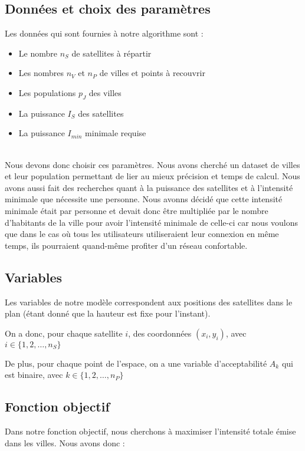 \documentclass[a4paper]{article}
\begin{document}
\subsection{Données et choix des paramètres}
Les données qui sont fournies à notre algorithme sont :
\begin{itemize}
    \item Le nombre $n_S$ de satellites à répartir
    \item Les nombres $n_V$ et $n_P$ de villes et points à recouvrir
    \item Les populations $p_J$ des villes 
    \item La puissance $I_S$ des satellites
    \item La puissance $I_{min}$ minimale requise
\end{itemize}
\\
Nous devons donc choisir ces paramètres. Nous avons cherché un dataset de villes et leur population permettant de lier au mieux précision et temps de calcul. Nous avons aussi fait des recherches quant à la puissance des satellites et à l'intensité minimale que nécessite une personne. Nous avonns décidé que cette intensité minimale était par personne et devait donc être multipliée par le nombre d'habitants de la ville pour avoir l'intensité minimale de celle-ci car nous voulons que dans le cas où tous les utilisateurs utiliseraient leur connexion en même temps, ils pourraient quand-même profiter d'un réseau confortable.


\subsection{Variables}
Les variables de notre modèle correspondent aux positions des satellites dans le plan (étant donné que la hauteur est fixe pour l'instant).

On a donc, pour chaque satellite $i$, des coordonnées $(x_{i},y_{i})$, avec $i \in \{1, 2, \ldots, n_S\}$

De plus, pour chaque point de l'espace, on a une variable d'acceptabilité $A_k$ qui est binaire, avec $k \in \{1,2,\ldots,n_P\}$


\subsection{Fonction objectif}

Dans notre fonction objectif, nous cherchons à maximiser l'intensité totale émise dans les villes. Nous avons donc :
\end{document}
